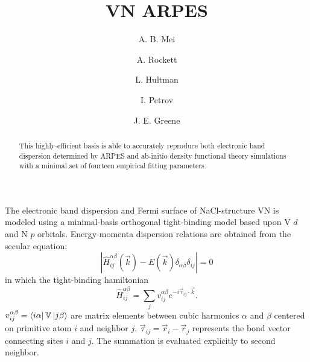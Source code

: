 \documentclass[twocolumn,showpacs,preprintnumbers,superscriptaddress,prb,floatfix,aps,10pt]{revtex4-1}
\newcommand*{\ham}{\hat{H}}
\newcommand*{\bondvec}{\vec{\tau}_{ij}}
\begin{document}

\title{VN ARPES}

\author{A. B. Mei}

\author{A. Rockett}

\author{L. Hultman}

\author{I. Petrov}

\author{J. E. Greene}

\begin{abstract}

This highly-efficient basis is able to accurately reproduce both electronic band dispersion determined by ARPES and ab-initio density functional theory simulations with a minimal set of fourteen empirical fitting parameters.
\end{abstract}

\maketitle


 

The electronic band dispersion and Fermi surface of NaCl-structure VN is modeled using a minimal-basis orthogonal tight-binding model based upon V $d$ and N $p$ orbitals. Energy-momenta dispersion relations are obtained from the secular equation:
\begin{equation}
\label{eq:secular}
\left| \ham^{\alpha\beta}_{ij}(\vec{k}) - E(\vec{k})\delta_{\alpha\beta}\delta_{ij} \right| = 0
\end{equation}
in which the tight-binding hamiltonian
\begin{equation}
\label{eq:ham}
\ham^{\alpha\beta}_{ij} = \sum_j v^{\alpha\beta}_{ij} e^{-i\vec{\tau}_{ij} \cdot \vec{k} }.
\end{equation}
$v^{\alpha\beta}_{ij} = \bra{i\alpha} \mathbb{V} \ket{j\beta}$ are matrix elements between cubic harmonics $\alpha$ and $\beta$ centered on primitive atom $i$ and neighbor $j$. $\bondvec = \vec{r}_i - \vec{r}_j$ represents the bond vector connecting sites $i$ and $j$. The summation is evaluated explicitly to second neighbor.
\end{document}
